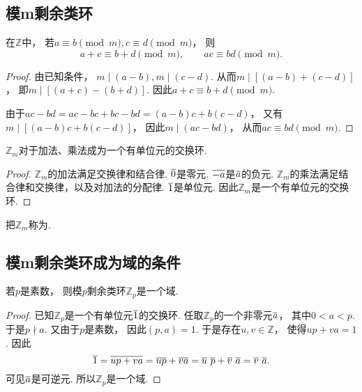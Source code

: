 \subsection{模m剩余类环}
\begin{proposition}
在\(\mathbb{Z}\)中，
若\(a\equiv b\pmod m,
c\equiv d\pmod m\)，
则\begin{equation*}
	a+c\equiv b+d\pmod m, \qquad
	ac\equiv bd\pmod m.
\end{equation*}
\begin{proof}
由已知条件，
\(m\mid(a-b),
m\mid(c-d)\).
从而\(m\mid[(a-b)+(c-d)]\)，
即\(m\mid[(a+c)-(b+d)]\).
因此\(a+c\equiv b+d\pmod m\).

由于\(ac-bd
=ac-bc+bc-bd
=(a-b)c+b(c-d)\)，
又有\(m\mid[(a-b)c+b(c-d)]\)，
因此\(m\mid(ac-bd)\)，
从而\(ac\equiv bd\pmod m\).
\end{proof}
\end{proposition}

\begin{proposition}\label{theorem:剩余类环.整数集对模m同余关系的商集对加法和乘法成环}
\(\mathbb{Z}_m\)对于加法、乘法成为一个有单位元的交换环.
\begin{proof}
\(\mathbb{Z}_m\)的加法满足交换律和结合律.
\(\EquivalenceClassO{0}\)是零元.
\(\EquivalenceClassO{-a}\)是\(\EquivalenceClassO{a}\)的负元.
\(\mathbb{Z}_m\)的乘法满足结合律和交换律，以及对加法的分配律.
\(\EquivalenceClassO{1}\)是单位元.
因此\(\mathbb{Z}_m\)是一个有单位元的交换环.
\end{proof}
\end{proposition}

\begin{definition}
把\(\mathbb{Z}_m\)称为.
\end{definition}

\subsection{模m剩余类环成为域的条件}
\begin{theorem}
若\(p\)是素数，
则模\(p\)剩余类环\(\mathbb{Z}_p\)是一个域.
\begin{proof}
已知\(\mathbb{Z}_p\)是一个有单位元\(\EquivalenceClassO{1}\)的交换环.
任取\(\mathbb{Z}_p\)的一个非零元\(\EquivalenceClassO{a}\)，
其中\(0<a<p\).
于是\(p \nmid a\).
又由于\(p\)是素数，
因此\((p,a)=1\).
于是存在\(u,v\in\mathbb{Z}\)，
使得\(up+va=1\).
因此\begin{equation*}
	\EquivalenceClassO{1}
	=\EquivalenceClassO{up+va}
	=\EquivalenceClassO{up}
	+\EquivalenceClassO{va}
	=\EquivalenceClassO{u}~\EquivalenceClassO{p}
	+\EquivalenceClassO{v}~\EquivalenceClassO{a}
	=\EquivalenceClassO{v}~\EquivalenceClassO{a}.
\end{equation*}
可见\(\EquivalenceClassO{a}\)是可逆元.
所以\(\mathbb{Z}_p\)是一个域.
\end{proof}
\end{theorem}

